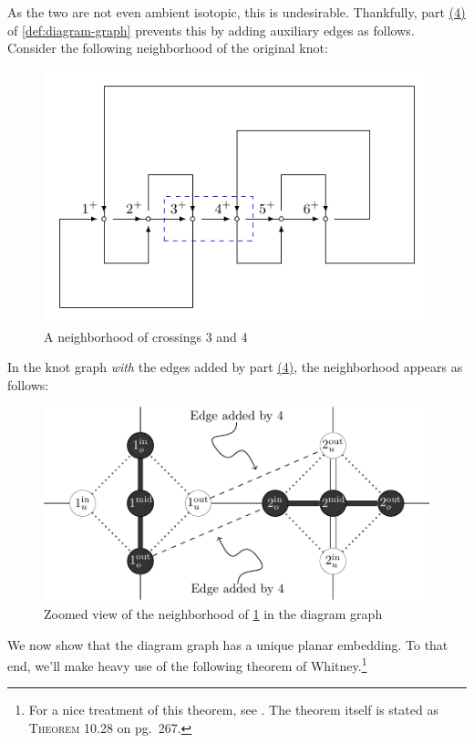 As the two are not even ambient isotopic, this is undesirable.
Thankfully, part \hyperlink{graph-step-4}{(4)} of
\cref{def:diagram-graph} prevents this by adding auxiliary edges as
follows. Consider the following neighborhood of the original knot:
\begin{figure}[H]
  \centering
  \includegraphics[scale=.7]{figures/unknotting-moves-and-combinatorial-representations/3-1-csum-boxed-2.pdf}
  \caption{A neighborhood of crossings $3$ and $4$}
  \label{fig:new-neighborhood}
\end{figure}
In the knot graph \emph{with} the edges added by part
\hyperlink{graph-step-4}{(4)}, the neighborhood appears as follows:
\begin{figure}[H]
  \centering
  \includegraphics[]{figures/unknotting-moves-and-combinatorial-representations/3-1-c3-c4-zoom.pdf}
  \caption{Zoomed view of the neighborhood of
    \cref{fig:new-neighborhood} in the diagram graph}
\end{figure}
We now show that the diagram graph has a unique planar embedding. To
that end, we'll make heavy use of the following theorem of
Whitney.\footnote{For a nice treatment of this theorem, see
  \cite{Bondy2008}. The theorem itself is stated as {\scshape Theorem
    10.28} on pg.\ 267.}
